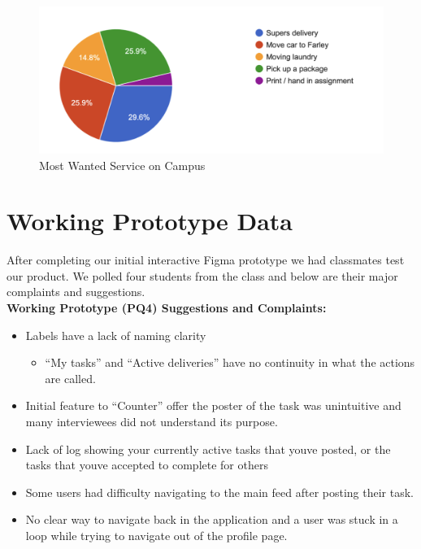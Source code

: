 \begin{figure}[ht]
        \centering
        \caption{Most Wanted Service on Campus}
        \includegraphics[width=1\textwidth]{images/pie.png}
        
        \label{fig:bird1}
    \end{figure}


\clearpage 
\section{Working Prototype Data}

After completing our initial interactive Figma prototype we had classmates test our product. We polled four students from the class and below are their major complaints and suggestions. \\


\noindent \textbf{Working Prototype (PQ4) Suggestions and Complaints:}
\begin{itemize}
\item Labels have a lack of naming clarity
\begin{itemize}
\item “My tasks” and “Active deliveries” have no continuity in what the actions are called.
\end{itemize}
\item Initial feature to “Counter” offer the poster of the task was unintuitive and many interviewees did not understand its purpose.
\item Lack of log showing your currently active tasks that youve posted, or the tasks that youve accepted to complete for others
\item Some users had difficulty navigating to the main feed after posting their task.
\item No clear way to navigate back in the application and a user was stuck in a loop while trying to navigate out of the profile page.
\end{itemize}


